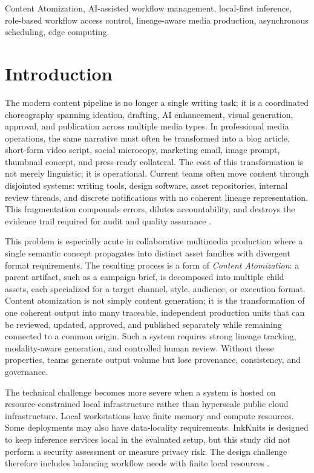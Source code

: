 \documentclass[conference]{IEEEtran}
\begin{document}
\begin{IEEEkeywords}
Content Atomization, AI-assisted workflow management, local-first inference, role-based workflow access control, lineage-aware media production, asynchronous scheduling, edge computing.
\end{IEEEkeywords}

\section{Introduction}
The modern content pipeline is no longer a single writing task; it is a coordinated choreography spanning ideation, drafting, AI enhancement, visual generation, approval, and publication across multiple media types. In professional media operations, the same narrative must often be transformed into a blog article, short-form video script, social microcopy, marketing email, image prompt, thumbnail concept, and press-ready collateral. The cost of this transformation is not merely linguistic; it is operational. Current teams often move content through disjointed systems: writing tools, design software, asset repositories, internal review threads, and discrete notifications with no coherent lineage representation. This fragmentation compounds errors, dilutes accountability, and destroys the evidence trail required for audit and quality assurance \cite{velaga2024,unlu2020}.

This problem is especially acute in collaborative multimedia production where a single semantic concept propagates into distinct asset families with divergent format requirements. The resulting process is a form of \emph{Content Atomization}: a parent artifact, such as a campaign brief, is decomposed into multiple child assets, each specialized for a target channel, style, audience, or execution format. Content atomization is not simply content generation; it is the transformation of one coherent output into many traceable, independent production units that can be reviewed, updated, approved, and published separately while remaining connected to a common origin. Such a system requires strong lineage tracking, modality-aware generation, and controlled human review. Without these properties, teams generate output volume but lose provenance, consistency, and governance.

The technical challenge becomes more severe when a system is hosted on resource-constrained local infrastructure rather than hyperscale public cloud infrastructure. Local workstations have finite memory and compute resources. Some deployments may also have data-locality requirements. InkKnits is designed to keep inference services local in the evaluated setup, but this study did not perform a security assessment or measure privacy risk. The design challenge therefore includes balancing workflow needs with finite local resources \cite{yang2024,alhafis2026}.
\end{document}
